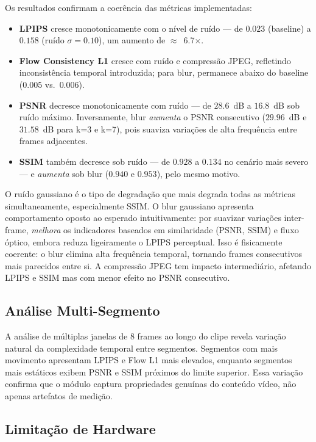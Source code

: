 \documentclass[conference]{IEEEtran}
\begin{document}
Os resultados confirmam a coerência das métricas implementadas:
\begin{itemize}
    \item \textbf{LPIPS} cresce monotonicamente com o nível de ruído — de $0.023$ (baseline) a $0.158$ (ruído $\sigma=0.10$), um aumento de $\approx$~6.7$\times$.
    \item \textbf{Flow Consistency L1} cresce com ruído e compressão JPEG, refletindo inconsistência temporal introduzida; para blur, permanece abaixo do baseline ($0.005$ vs.\ $0.006$).
    \item \textbf{PSNR} decresce monotonicamente com ruído — de $28.6$~dB a $16.8$~dB sob ruído máximo. Inversamente, blur \emph{aumenta} o PSNR consecutivo ($29.96$~dB e $31.58$~dB para k=3 e k=7), pois suaviza variações de alta frequência entre frames adjacentes.
    \item \textbf{SSIM} também decresce sob ruído — de $0.928$ a $0.134$ no cenário mais severo — e \emph{aumenta} sob blur ($0.940$ e $0.953$), pelo mesmo motivo.
\end{itemize}

O ruído gaussiano é o tipo de degradação que mais degrada todas as métricas simultaneamente, especialmente SSIM. O blur gaussiano apresenta comportamento oposto ao esperado intuitivamente: por suavizar variações inter-frame, \emph{melhora} os indicadores baseados em similaridade (PSNR, SSIM) e fluxo óptico, embora reduza ligeiramente o LPIPS perceptual. Isso é fisicamente coerente: o blur elimina alta frequência temporal, tornando frames consecutivos mais parecidos entre si. A compressão JPEG tem impacto intermediário, afetando LPIPS e SSIM mas com menor efeito no PSNR consecutivo.

\subsection{Análise Multi-Segmento}

A análise de múltiplas janelas de 8 frames ao longo do clipe revela variação natural da complexidade temporal entre segmentos. Segmentos com mais movimento apresentam LPIPS e Flow L1 mais elevados, enquanto segmentos mais estáticos exibem PSNR e SSIM próximos do limite superior. Essa variação confirma que o módulo captura propriedades genuínas do conteúdo vídeo, não apenas artefatos de medição.

\subsection{Limitação de Hardware}
\end{document}
